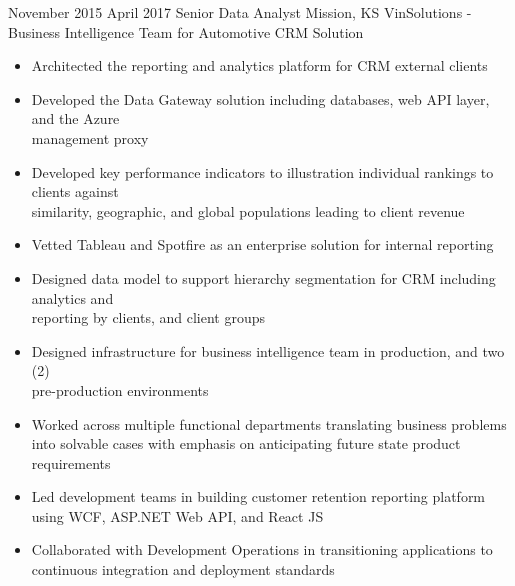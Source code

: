 \ProjectExperience
{November 2015}
{April 2017}
{Senior Data Analyst}
{Mission, KS}
{VinSolutions - Business Intelligence Team for Automotive CRM Solution}
{\begin{itemize}
     \item Architected the reporting and analytics platform for CRM external clients
     \item Developed the Data Gateway solution including databases, web API layer, and the
     Azure \\management proxy
     \item Developed key performance indicators to illustration individual rankings to clients
     against \\similarity, geographic, and global populations leading to client revenue
\end{itemize}}
{\begin{itemize}
    \item Vetted Tableau and Spotfire as an enterprise solution for internal reporting
    \item Designed data model to support hierarchy segmentation for CRM including analytics and
    \\reporting by clients, and client groups
    \item Designed infrastructure for business intelligence team in production, and two (2)
    \\pre-production environments
\end{itemize}}
{\begin{itemize}
    \item Worked across multiple functional departments translating business problems into
    solvable cases with emphasis on anticipating future state product requirements
    \item Led development teams in building customer retention reporting platform using WCF,
    ASP.NET Web API, and React JS
    \item Collaborated with Development Operations in transitioning applications to continuous
    integration and deployment standards
\end{itemize}}

\vspace*{0.05 in}

